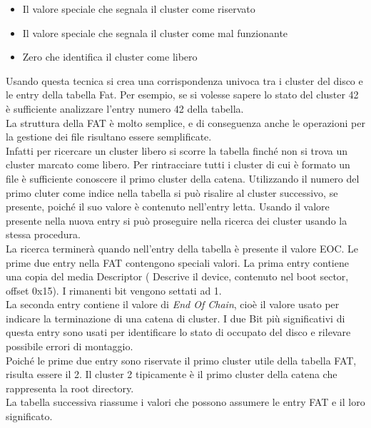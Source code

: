 	  \begin{itemize}
	   \item Il valore speciale che segnala il cluster come riservato
	  \end{itemize}

	   \begin{itemize}
	    \item  Il valore speciale che segnala il cluster come mal funzionante
	  \end{itemize}

	  \begin{itemize}
	   \item Zero che identifica il cluster come libero
	  \end{itemize}
    
    Usando questa tecnica si crea una corrispondenza univoca tra i cluster del disco e le entry della tabella Fat. Per esempio, se si volesse sapere lo stato del cluster 42 è sufficiente analizzare l'entry numero 42 della tabella. \\
    La struttura della FAT è molto semplice, e di conseguenza anche le operazioni per la gestione dei file risultano essere semplificate.\\
    Infatti per ricercare un cluster libero si scorre la tabella finché non si trova un cluster marcato come libero.
    Per rintracciare tutti i cluster di cui è formato un file è sufficiente conoscere il primo cluster della catena.
    Utilizzando il numero del primo cluter come indice nella tabella si può risalire al cluster successivo, se presente, poiché il suo valore è contenuto nell'entry letta. Usando il valore presente nella nuova entry si può proseguire nella ricerca dei cluster usando la stessa procedura.\\
    La ricerca terminerà quando nell'entry della tabella è presente il valore EOC.
    Le  prime due entry nella FAT contengono speciali valori. La prima entry contiene una copia del media Descriptor ( Descrive il device, contenuto nel boot sector, offset 0x15). I rimanenti bit vengono settati ad 1.\\ 
    La seconda entry contiene il valore di \textit{End Of Chain}, cioè il valore usato per indicare la terminazione di una catena di cluster. I due Bit più significativi di questa entry sono usati per identificare lo stato di occupato del disco e rilevare possibile errori di montaggio.\\ 
    Poiché le prime due entry sono riservate il primo cluster utile della tabella FAT, risulta essere il 2. Il cluster 2 tipicamente è il primo cluster della catena che rappresenta la root directory. \\
    La tabella successiva riassume i valori che possono assumere le entry FAT e il loro significato.\\


